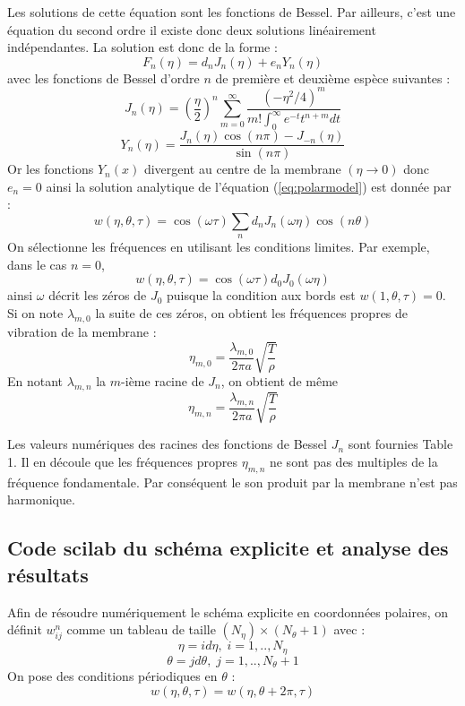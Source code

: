 \documentclass[a4,12pt]{article}
\begin{document}
Les solutions de cette équation sont les fonctions de Bessel. Par ailleurs, c'est une équation du second ordre il existe donc deux solutions linéairement indépendantes. La solution est donc de la forme :
\[
F_n(\eta)=d_nJ_n(\eta)+e_nY_n(\eta)
\]
avec les fonctions de Bessel d'ordre $n$ de première et deuxième espèce suivantes :
\[
J_n(\eta)=\left(\dfrac{\eta}{2}\right)^n\sum_{m=0}^{\infty} \dfrac{(-\eta^2/4)^m}{m!\int_0^{\infty}e^{-t}t^{n+m}dt}
\]
\[
Y_n(\eta)=\dfrac{J_n(\eta)\cos(n\pi)-J_{-n}(\eta)}{\sin(n\pi)}
\]
Or les fonctions $Y_n(x)$ divergent au centre de la membrane $(\eta\rightarrow 0)$ donc $e_n=0$
ainsi la solution analytique de l'équation (\ref{eq:polarmodel}) est donnée par :
\[
w(\eta,\theta,\tau)=\cos(\omega \tau)\sum_n d_nJ_n(\omega\eta)\cos(n\theta)
\]
On sélectionne les fréquences en utilisant les conditions limites. Par exemple, dans le cas $n=0$, 
\[
w(\eta,\theta,\tau)=\cos(\omega \tau) d_0J_0(\omega \eta)
\]
ainsi $\omega$ décrit les zéros de $J_0$ puisque la condition aux bords est $w(1,\theta,\tau)=0$. Si on note $\lambda_{m,0}$ la suite de ces zéros, on obtient les fréquences propres de vibration de la membrane :
\[
\eta_{m,0}=\dfrac{\lambda_{m,0}}{2\pi a} \sqrt{\frac{T}{\rho}}
\]
En notant $\lambda_{m,n}$ la $m$-ième racine de $J_n$, on obtient de même 
\[
\eta_{m,n}=\dfrac{\lambda_{m,n}}{2\pi a} \sqrt{\frac{T}{\rho}}
\]

Les valeurs numériques des racines des fonctions de Bessel $J_n$ sont fournies Table 1. Il en découle que les fréquences propres $\eta_{m,n}$ ne sont pas des multiples de la fréquence fondamentale. Par conséquent le son produit par la membrane n'est pas harmonique.

\newpage 

\subsection{Code scilab du schéma explicite et analyse des résultats}

Afin de résoudre numériquement le schéma explicite en coordonnées polaires, on définit $w_{ij}^n$ comme un tableau de taille $(N_\eta)\times(N_\theta+1)$ avec :
\[
\eta=id\eta ,\;i=1,..,N_\eta
\]
\[
\theta=jd\theta ,\;j=1,..,N_\theta+1
\]
On pose des conditions périodiques en $\theta$ :
\[
w(\eta,\theta,\tau)=w(\eta,\theta+2\pi,\tau)
\]

\end{document}

